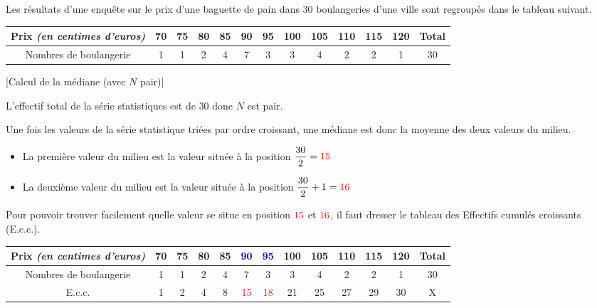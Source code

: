 \documentclass[10pt,a4paper,openany,twoside, eleve]{book}
\begin{document}
\begin{ex}{}{}
Les résultats d'une enquête sur le prix d'une baguette de pain dans 30 boulangeries d'une ville sont regroupés dans le tableau suivant.
\begin{center}
\renewcommand{\arraystretch}{1.9}
\begin{tabular}{|c|c|c|c|c|c|c|c|c|c|c|c|c|}
\hline
Prix \textit{(en centimes d'euros)} & 70 & 75 & 80 & 85 & 90 & 95 & 100 & 105 & 110 & 115 & 120 & Total \\
\hline
Nombres de boulangerie & 1 & 1 & 2 & 4 & 7 & 3 & 3 & 4 & 2 & 2 & 1 & 30 \\
\hline
\end{tabular}
\end{center}

\begin{methode}{}{}[Calcul de la médiane (avec $N$ pair)]\label{meth_med_pair}

L'effectif total de la série statistiques est de $30$ donc $N$ est pair.

\noindent Une fois les valeurs de la série statistique triées par ordre croissant, une médiane est donc la moyenne des deux valeurs du milieu.
\begin{itemize}
\item[-]La première valeur du milieu est la valeur située à la position $ \dfrac{30}{2} = \textcolor{red}{15} $
\item[-]La deuxième valeur du milieu est la valeur située à la position $ \dfrac{30}{2}+1 = \textcolor{red}{16} $
\end{itemize}

\noindent Pour pouvoir trouver facilement quelle valeur se situe en position $\textcolor{red}{15}$ et $\textcolor{red}{16}$, il faut dresser le tableau des Effectifs cumulés croissants (E.c.c.).
\begin{center}
\renewcommand{\arraystretch}{1.8}
\begin{tabular}{|c|c|c|c|c|c|c|c|c|c|c|c|c|}
\hline
Prix \textit{(en centimes d'euros)} & 70 & 75 & 80 & 85 & \textcolor{blue}{90} & \textcolor{blue}{95} & 100 & 105 & 110 & 115 & 120 & Total \\
\hline
Nombres de boulangerie & 1 & 1 & 2 & 4 & 7 & 3 & 3 & 4 & 2 & 2 & 1 & 30 \\
\hline
E.c.c. & 1 & 2 & 4 & 8 & \textcolor{red}{15} & \textcolor{red}{18} & 21 & 25 & 27 & 29 & 30 & X \\
\hline
\end{tabular}
\end{center}


\end{methode}
\end{ex}
\end{document}
